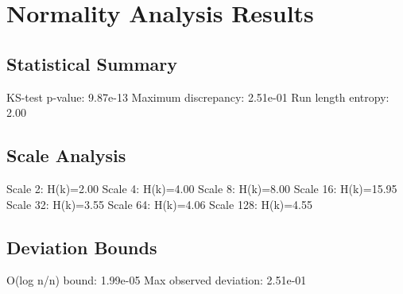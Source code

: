 \section{Normality Analysis Results}

\subsection{Statistical Summary}
KS-test p-value: 9.87e-13
Maximum discrepancy: 2.51e-01
Run length entropy: 2.00

\subsection{Scale Analysis}
Scale 2: H(k)=2.00
Scale 4: H(k)=4.00
Scale 8: H(k)=8.00
Scale 16: H(k)=15.95
Scale 32: H(k)=3.55
Scale 64: H(k)=4.06
Scale 128: H(k)=4.55
\subsection{Deviation Bounds}
O(log n/n) bound: 1.99e-05
Max observed deviation: 2.51e-01
